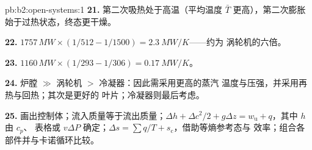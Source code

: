 \begin{solution}{pb:b2:open-systems:1}
\textbf{21.} 第二次吸热处于高温（平均温度
$\bar T$ 更高），第二次膨胀始于过热状态，终态更干燥。

\textbf{22.} $1757\,\unit{MW} \times (1/512 - 1/1500) = \qty{2.3}{MW/K}$——约为
涡轮机的六倍。

\textbf{23.} $1160\,\unit{MW} \times (1/293 - 1/306) = \qty{0.17}{MW/K}$。

\textbf{24.} 炉膛 $\gg$ 涡轮机 $>$ 冷凝器：因此需采用更高的蒸汽
温度与压强，并采用再热与回热；其次是更好的
叶片；冷凝器则最后考虑。

\textbf{25.} 画出控制体；流入质量等于流出质量；$\Delta h +
\Delta c^2/2 + g\Delta z = w_{\text{u}} + q$，其中 $h$ 由 $c_p$、
表格或 $v\Delta P$ 确定；$\Delta s = \sum q/T + s_{\text{c}}$，借助等熵参考态与
效率；组合各部件并与卡诺循环比较。
\end{solution}
